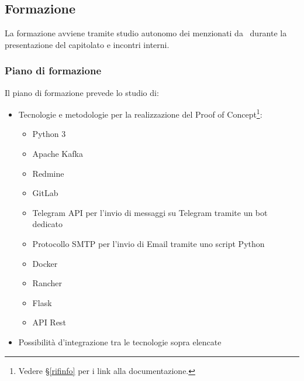 	\subsection{Formazione}\label{Formazione}

		La formazione avviene tramite studio autonomo dei  menzionati da \II\ durante la presentazione del capitolato e incontri interni.

		\subsubsection{Piano di formazione}
		Il piano di formazione prevede lo studio di:
		\begin{itemize}
			\item Tecnologie e metodologie per la realizzazione del Proof of Concept\footnote{Vedere \S\ref{rifinfo} per i link alla documentazione.}:
			\begin{itemize}
				\item Python 3
				\item Apache Kafka
				\item Redmine
				\item GitLab
				\item Telegram API per l'invio di messaggi su Telegram tramite un bot dedicato
				\item Protocollo SMTP per l'invio di Email tramite uno script Python
				\item Docker
				\item Rancher
				\item Flask
				\item API Rest
			\end{itemize}
			\item Possibilità d'integrazione tra le tecnologie sopra elencate
		\end{itemize}
